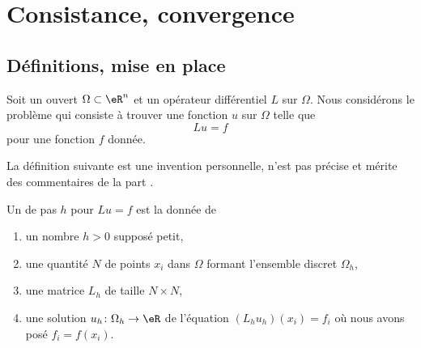 \section{Consistance, convergence}

\subsection{Définitions, mise en place}

Soit un ouvert \( \Omega\subset \eR^n\) et un opérateur différentiel \( L\) sur \( \Omega\). Nous considérons le problème qui consiste à trouver une fonction \( u\) sur \( \Omega\) telle que
\begin{equation}
	Lu=f
\end{equation}
pour une fonction \( f\) donnée.

\begin{probleme}
    La définition suivante est une invention personnelle, n'est pas précise et mérite des commentaires de la part .
\end{probleme}
\begin{definition}
	Un  de pas \( h\) pour \( Lu=f\) est la donnée de
	\begin{enumerate}
		\item
		      un nombre \( h>0\) supposé petit,
		\item
		      une quantité \( N\) de points \( x_i \) dans \( \Omega\) formant l'ensemble discret \( \Omega_h\),
		\item
		      une matrice \( L_h\) de taille \( N\times N\),
		\item
		      une solution \( u_h\colon \Omega_h\to \eR\) de l'équation \( (L_hu_h)(x_i)=f_i\) où nous avons posé \( f_i=f(x_i)\).
	\end{enumerate}
\end{definition}

